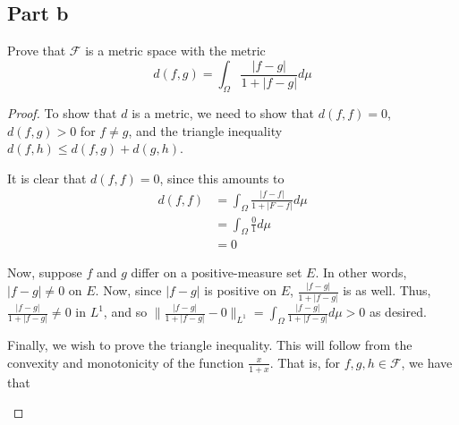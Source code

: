 \documentclass[fontsize=11pt]{scrartcl} %
\numberwithin{equation}{section} %
\numberwithin{figure}{section} %
\numberwithin{table}{section} %
\begin{document}
\subsection*{Part b}
Prove that $\mathscr{F}$ is a metric space with the metric
\[
    d(f,g) = \int_{\Omega}\frac{|f-g|}{1+|f-g|}d\mu
\]
\begin{proof}
    To show that $d$ is a metric, we need to show that $d(f,f)=0$, $d(f,g)>0$
    for $f\neq g$, and the triangle inequality $d(f,h)\leq d(f,g)+d(g,h)$.

    It is clear that $d(f,f)=0$, since this amounts to
    \[
        \begin{aligned}
            d(f,f) &= \int_{\Omega}\frac{|f-f|}{1+|F-f|}d\mu\\
                    &=\int_{\Omega}\frac{0}{1}d\mu\\
                    &=0
        \end{aligned}
    \]

    Now, suppose $f$ and $g$ differ on a positive-measure set $E$. In other
    words, $|f-g|\neq 0$ on $E$. Now, since $|f-g|$ is positive on $E$,
    $\frac{|f-g|}{1+|f-g|}$ is as well. Thus, $\frac{|f-g|}{1+|f-g|}\neq 0$ in
    $L^1$, and so $\|\frac{|f-g|}{1+|f-g|}-0\|_{L^1}
    =\int_{\Omega}\frac{|f-g|}{1+|f-g|}d\mu >0$ as desired.

    Finally, we wish to prove the triangle inequality. This will follow from the
    convexity and monotonicity of the function $\frac{x}{1+x}$. That is, for
    $f,g,h\in\mathscr{F}$, we have that

    \[

    \]
\end{proof}
\end{document}
